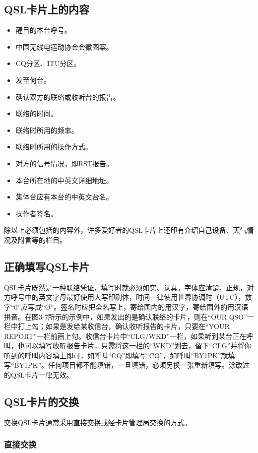 \documentclass[12pt,UTF8]{ctexbook}
\begin{document}
\subsection{QSL卡片上的内容}

\begin{itemize}
	\item 醒目的本台呼号。
	\item 中国无线电运动协会会徽图案。
	\item CQ分区、ITU分区。
	\item 发至何台。
	\item 确认双方的联络或收听台的报告。
	\item 联络的时间。
	\item 联络时所用的频率。
	\item 联络时所用的操作方式。
	\item 对方的信号情况，即RST报告。
	\item 本台所在地的中英文详细地址。
	\item 集体台应有本台的中英文台名。
	\item 操作者签名。
\end{itemize}

除以上必须包括的内容外，许多爱好者的QSL卡片上还印有介绍自己设备、天气情况及附言等的栏目。

\subsection{正确填写QSL卡片}

QSL卡片既然是一种联络凭证，填写时就必须如实、认真，字体应清楚、正规，对方呼号中的英文字母最好使用大写印刷体，时间一律使用世界协调时（UTC），数字“0”应写成“Ø”。签名时应把全名写上，寄给国内的用汉字，寄给国外的用汉语拼音。在图3-7所示的示例中，如果发出的是确认联络的卡片，则在“OUR QSO”一栏中打上勾；如果是发给某收信台，确认收听报告的卡片，只要在“YOUR REPORT”一栏前画上勾。收信台卡片中“CLG/WKD”一栏，如果听到某台正在呼叫，也可以填写收听报告卡片，只需将这一栏的“WKD”划去，留下“CLG”并将你听到的呼叫内容填上即可，如呼叫“CQ”即填写“CQ”，如呼叫“BY1PK”就填写“BY1PK”。任何项目都不能填错，一旦填错，必须另换一张重新填写。涂改过的QSL卡片一律无效。

\subsection{QSL卡片的交换}

交换QSL卡片通常采用直接交换或经卡片管理局交换的方式。

\subsubsection{直接交换}
\end{document}
